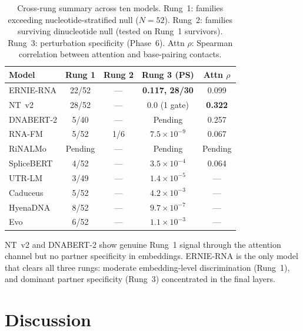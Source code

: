 \documentclass[11pt]{article}
\begin{document}
\begin{table}[ht]
\centering
\caption{Cross-rung summary across ten models.  Rung~1: families
  exceeding nucleotide-stratified null ($N = 52$).  Rung~2: families
  surviving dinucleotide null (tested on Rung~1 survivors).
  Rung~3: perturbation specificity (Phase~6).  Attn $\rho$: Spearman
  correlation between attention and base-pairing contacts.}
\label{tab:crossrung}
\begin{tabular}{lcccc}
\toprule
Model & Rung 1 & Rung 2 & Rung 3 (PS) & Attn $\rho$ \\
\midrule
ERNIE-RNA   & 22/52 & --- & \textbf{0.117, 28/30} & 0.099 \\
NT~v2       & 28/52 & --- & 0.0 (1 gate) & \textbf{0.322} \\
DNABERT-2   & 5/40  & --- & Pending & 0.257 \\
RNA-FM      & 5/52  & 1/6 & $7.5 \times 10^{-9}$ & 0.067 \\
RiNALMo     & Pending & --- & Pending & Pending \\
SpliceBERT  & 4/52  & --- & $3.5 \times 10^{-4}$ & 0.064 \\
UTR-LM      & 3/49  & --- & $1.4 \times 10^{-5}$ & --- \\
Caduceus    & 5/52  & --- & $4.2 \times 10^{-3}$ & --- \\
HyenaDNA    & 8/52  & --- & $9.7 \times 10^{-7}$ & --- \\
Evo         & 6/52  & --- & $1.1 \times 10^{-3}$ & --- \\
\bottomrule
\end{tabular}
\end{table}

NT~v2 and DNABERT-2 show genuine Rung~1 signal through the attention
channel but no partner specificity in embeddings.  ERNIE-RNA is the
only model that clears all three rungs: moderate embedding-level
discrimination (Rung~1), and dominant partner specificity (Rung~3)
concentrated in the final layers.


\section{Discussion}
\label{sec:discussion}
\end{document}
